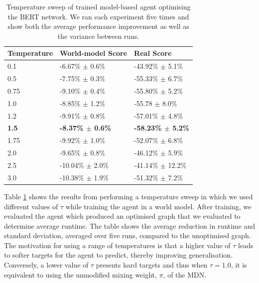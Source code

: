 \begin{table}[htbp]
  \centering
  \begin{tabular}{@{}lll@{}}
  \toprule
  Temperature  & World-model Score        & Real Score                \\ \midrule
  0.1          & -6.67\% $\pm$ 0.6\%          & -43.92\% $\pm$ 5.1\%         \\
  0.5          & -7.75\% $\pm$ 0.3\%          & -55.33\% $\pm$ 6.7\%         \\
  0.75         & -9.10\% $\pm$ 0.4\%          & -55.80\% $\pm$ 5.2\%         \\
  1.0          & -8.85\% $\pm$ 1.2\%          & -55.78 $\pm$ 8.0\%           \\
  1.2          & -9.91\% $\pm$ 0.8\%          & -57.01\% $\pm$ 4.8\%         \\
  \textbf{1.5} & \textbf{-8.37\% $\mathbf{\pm}$ 0.6\%} & \textbf{-58.23\% $\mathbf{\pm}$ 5.2\%} \\
  1.75         & -9.92\% $\pm$ 1.0\%          & -52.07\% $\pm$ 6.8\%         \\
  2.0          & -9.65\% $\pm$ 0.8\%          & -46.12\% $\pm$ 5.9\%         \\
  2.5          & -10.04\% $\pm$ 2.0\%         & -41.14\% $\pm$ 12.2\%         \\
  3.0          & -10.38\% $\pm$ 1.9\%         & -51.32\% $\pm$ 7.2\%         \\ \bottomrule
  \end{tabular}
  \caption[Rewards using range of temperatures]{Temperature sweep of trained model-based agent optimising the BERT network. We ran each experiment five times and show both the average performance improvement as well as the variance between runs.}
  \label{table:eval:agent-temperatures}
\end{table}

Table \ref{table:eval:agent-temperatures} shows the results from performing a temperature sweep in which we used different values of $\tau$ while training the agent in a world model. After training, we evaluated the agent which produced an optimised graph that we evaluated to determine average runtime. The table shows the average reduction in runtime and standard deviation, averaged over five runs, compared to the unoptimised graph. The motivation for using a range of temperatures is that a higher value of $\tau$ leads to softer targets for the agent to predict, thereby improving generalisation. Conversely, a lower value of $\tau$ presents hard targets and thus when $\tau = 1.0$, it is equivalent to using the unmodified mixing weight, $\pi$, of the MDN.

